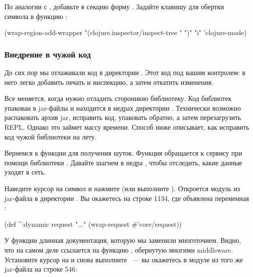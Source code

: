 По аналогии с , добавьте в секцию  форму . Задайте клавишу для обертки символа в функцию :

\begin{english}
  \begin{clojure}
(wrap-region-add-wrapper "(clojure.inspector/inspect-tree " ")" "i" 'clojure-mode)
  \end{clojure}
\end{english}

\subsubsection{Внедрение в чужой код}

До сих пор мы отлаживали код в директории . Этот код под вашим контролем: в него легко добавить печать и инспекцию, а затем откатить изменения.

Все меняется, когда нужно отладить стороннюю библиотеку. Код библиотек упакован в jar-файлы и находится в недрах директории . Технически возможно распаковать архив jar, исправить код, упаковать обратно, а затем перезагрузить REPL. Однако это займет массу времени. Способ ниже описывает, как исправить код чужой библиотеки на лету.

Вернемся к функции  для получения шуток. Функция обращается к сервису при помощи библиотеки . Давайте шагнем в недра , чтобы отследить, какие данные уходят в сеть.

Наведите курсор на символ  и нажмите  (или выполните ). Откроется модуль  из jar-файла в директории . Вы окажетесь на строке 1134, где объявлена переменная :

\begin{english}
  \begin{clojure}
(def ^:dynamic request
  "..."
  (wrap-request #'core/request))
  \end{clojure}
\end{english}

У функции длинная документация, которую мы заменили многоточием. Видно, что  на самом деле ссылается на функцию , обернутую многими middleware. Установите курсор на  и снова выполните ~--- вы окажетесь в модуле  из того же jar-файла на строке 546:

